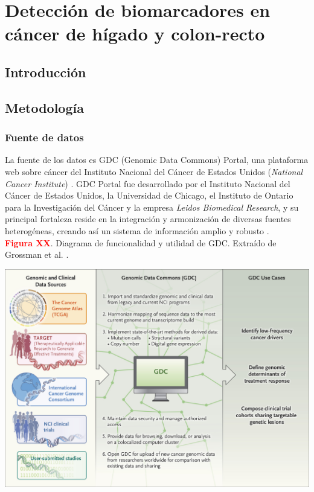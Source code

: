 \chapter{Detección de biomarcadores en cáncer de hígado y colon-recto}

\section{Introducción}

\section{Metodología}

\subsection{Fuente de datos}

La fuente de los datos es GDC (Genomic Data Commons) Portal, una plataforma web sobre cáncer del Instituto Nacional del Cáncer de Estados Unidos (\textit{National Cancer Institute}) \cite{GDCPortal, NationalCancerInstitute}. GDC Portal fue desarrollado por el Instituto Nacional del Cáncer de Estados Unidos, la Universidad de Chicago, el Instituto de Ontario para la Investigación del Cáncer y la empresa \textit{Leidos Biomedical Research}, y su principal fortaleza reside en la integración y armonización de diversas fuentes heterogéneas, creando así un sistema de información amplio y robusto \cite{Grossman2016}. \\

\newpage
\textbf{\textcolor{red}{Figura XX}}. Diagrama de funcionalidad y utilidad de GDC. Extraído de Grossman et al. \cite{Grossman2016}.
\begin{center}
	\includegraphics[width=1\textwidth]{figuras/funcionamiento_gdc.jpeg} \\
\end{center}

